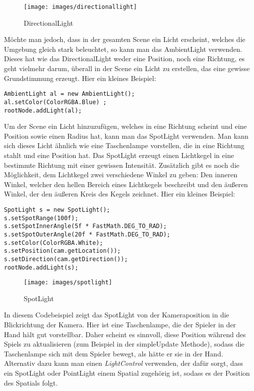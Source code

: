 \begin{figure}[h!]
	
	
	
	\centering\texttt{[image: images/directionallight]} 
	\caption{DirectionalLight}
	
\end{figure}

\newpage

Möchte man jedoch, dass in der gesamten Scene ein Licht erscheint, welches die Umgebung gleich stark beleuchtet, so kann man das AmbientLight verwenden. Dieses hat wie das DirectionalLight weder eine Position, noch eine Richtung, es geht vielmehr darum, überall in der Scene ein Licht zu erstellen, das eine gewisse Grundstimmung erzeugt. Hier ein kleines Beispiel:

\begin{lstlisting}
AmbientLight al = new AmbientLight();
al.setColor(ColorRGBA.Blue) ;
rootNode.addLight(al);
\end{lstlisting}

Um der Scene ein Licht hinzuzufügen, welches in eine Richtung scheint und eine Position sowie einen Radius hat, kann man das SpotLight verwenden. Man kann sich dieses Licht ähnlich wie eine Taschenlampe vorstellen, die in eine Richtung stahlt und eine Position hat. Das SpotLight erzeugt einen Lichtkegel in eine bestimmte Richtung mit einer gewissen Intensität. Zusätzlich gibt es noch die Möglichkeit, dem Lichtkegel zwei verschiedene Winkel zu geben: Den inneren Winkel, welcher den hellen Bereich eines Lichtkegels beschreibt und den äußeren Winkel, der den äußeren Kreis des Kegels zeichnet. Hier ein kleines Beispiel:
\begin{lstlisting}
SpotLight s = new SpotLight();
s.setSpotRange(100f);                           
s.setSpotInnerAngle(5f * FastMath.DEG_TO_RAD); 
s.setSpotOuterAngle(20f * FastMath.DEG_TO_RAD); 
s.setColor(ColorRGBA.White); 
s.setPosition(cam.getLocation());         
s.setDirection(cam.getDirection());     
rootNode.addLight(s);
\end{lstlisting}

\begin{figure}[H]
	
	
	
	\centering\texttt{[image: images/spotlight]} 
	\caption{SpotLight}
	
\end{figure}
In diesem Codebeispiel zeigt das SpotLight von der Kameraposition in die Blickrichtung der Kamera. Hier ist eine Taschenlampe, die der Spieler in der Hand hält gut vorstellbar. Daher scheint es sinnvoll, diese Position während des Spiels zu aktualisieren (zum Beispiel in der simpleUpdate Methode), sodass die Taschenlampe sich mit dem Spieler bewegt, als hätte er sie in der Hand. Alternativ dazu kann man einen \emph{LightControl} verwenden, der dafür sorgt, dass ein SpotLight oder PointLight einem Spatial zugehörig ist, sodass es der Position des Spatials folgt.



